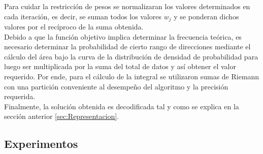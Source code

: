 Para cuidar la restricción de pesos se normalizaran los valores determinados en cada iteración, es decir, se suman todos los valores $w_j$ y se ponderan dichos valores por el recíproco de la suma obtenida.\\
Debido a que la función objetivo implica determinar la frecuencia teórica, es necesario determinar la probabilidad
de cierto rango de direcciones mediante el cálculo del área bajo la curva de la distribución de densidad de probabilidad para luego ser multiplicada por la suma del total de datos y así obtener el valor requerido. Por ende, para el cálculo de la integral se utilizaron sumas de Riemann con una partición conveniente al desempeño del algoritmo y la precisión requerida.\\
Finalmente, la solución obtenida es decodificada tal y como se explica en la sección anterior \ref{sec:Representacion}.
\subsection{Experimentos}

